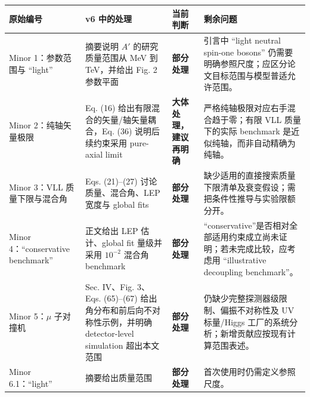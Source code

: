 \documentclass[
  chinese,
  UTF8]{ctexart}
\newcounter{none} %
\begin{document}
{\def\LTcaptype{none} %
\begin{longtable}[]{@{}
  >{\raggedright\arraybackslash}p{}
  >{\raggedright\arraybackslash}p{}
  >{\raggedright\arraybackslash}p{}
  >{\raggedright\arraybackslash}p{}@{}}
\toprule\noalign{}
\begin{minipage}[b]{\linewidth}\raggedright
原始编号
\end{minipage} & \begin{minipage}[b]{\linewidth}\raggedright
v6 中的处理
\end{minipage} & \begin{minipage}[b]{\linewidth}\raggedright
当前判断
\end{minipage} & \begin{minipage}[b]{\linewidth}\raggedright
剩余问题
\end{minipage} \\
\midrule\noalign{}
\endhead
\bottomrule\noalign{}
\endlastfoot
Minor 1：参数范围与 ``light'' & 摘要说明 \(A'\) 的研究质量范围从 MeV 到
TeV，并给出 Fig. 2 参数平面 & \textbf{部分处理} & 引言中 ``light neutral
spin-one bosons''
仍需要明确参照尺度；应区分论文目标范围与模型普适允许范围。 \\
Minor 2：纯轴矢量极限 & Eq. (16) 给出有限混合的矢量/轴矢量耦合，Eq. (36)
说明后续约束采用 pure-axial limit & \textbf{大体处理，建议再明确} &
严格纯轴极限对应右手混合趋于零；有限 VLL 质量下的实际 benchmark
是近似纯轴，而非自动精确为纯轴。 \\
Minor 3：VLL 质量下限与混合角 & Eqs. (21)--(27) 讨论质量、混合角、LEP
宽度与 global fits & \textbf{部分处理} &
缺少适用的直接搜索质量下限清单及衰变假设；需把条件性推导与实验限额分开。 \\
Minor 4：``conservative benchmark'' & 正文给出 LEP 估计、global fit
量级并采用 \(10^{-2}\) 混合角 benchmark & \textbf{部分处理} &
``conservative''是否相对全部适用约束成立尚未证明；若未完成比较，应考虑用
``illustrative decoupling benchmark''。 \\
Minor 5：\ensuremath{\mu} 子对撞机 & Sec. IV、Fig. 3、Eqs. (65)--(67)
给出角分布和前后向不对称性示例，并明确 detector-level simulation
超出本文范围 & \textbf{部分处理} &
仍缺少完整探测器级限制、偏振不对称性及 UV 标量/Higgs
工厂的系统分析；新增贡献应按现有计算范围表述。 \\
Minor 6.1：``light'' & 摘要给出质量范围 & \textbf{部分处理} &
首次使用时仍需定义参照尺度。 \\

\end{longtable}}
\end{document}
